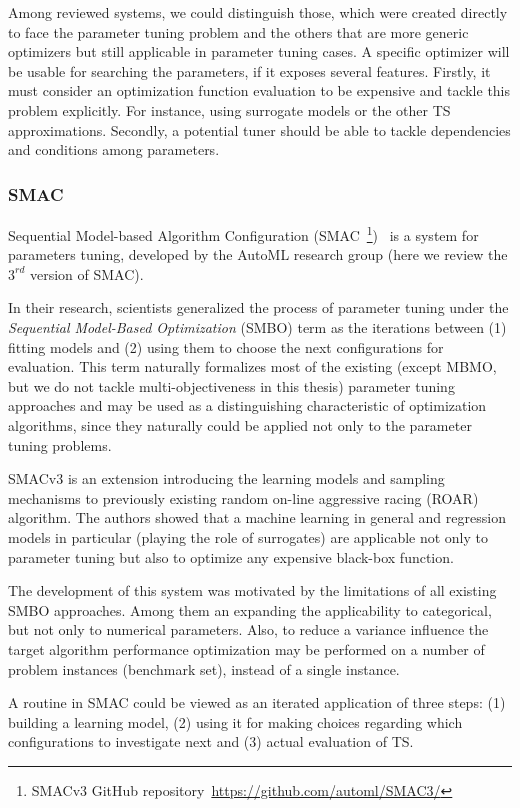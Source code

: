 Among reviewed systems, we could distinguish those, which were created directly to face the parameter tuning problem and the others that are more generic optimizers but still applicable in parameter tuning cases.
A specific optimizer will be usable for searching the parameters, if it exposes several features. Firstly, it must consider an optimization function evaluation to be expensive and tackle this problem explicitly. For instance, using surrogate models or the other TS approximations. Secondly, a potential tuner should be able to tackle dependencies and conditions among parameters.

\subsubsection{SMAC}\label{bg: smac}
Sequential Model-based Algorithm Configuration (SMAC~\footnote{SMACv3 GitHub repository~\url{https://github.com/automl/SMAC3/}})~\cite{hutter2011sequential} is a system for parameters tuning, developed by the AutoML research group (here we review the $3^{rd}$ version of SMAC). 

In their research, scientists generalized the process of parameter tuning under the  \emph{Sequential Model-Based Optimization} (SMBO) term as the iterations between (1) fitting models and (2) using them to choose the next configurations for evaluation. 
This term naturally formalizes most of the existing (except MBMO, but we do not tackle multi-objectiveness in this thesis) parameter tuning approaches and may be used as a distinguishing characteristic of optimization algorithms, since they naturally could be applied not only to the parameter tuning problems.

SMACv3 is an extension introducing the learning models and sampling mechanisms to previously existing random on-line aggressive racing (ROAR) algorithm. The authors showed that a machine learning in general and regression models in particular (playing the role of surrogates) are applicable not only to parameter tuning but also to optimize any expensive black-box function. 

The development of this system was motivated by the limitations of all existing SMBO approaches. Among them an expanding the applicability to categorical, but not only to numerical parameters. Also, to reduce a variance influence the target algorithm performance optimization may be performed on a number of problem instances (benchmark set), instead of a single instance.

A routine in SMAC could be viewed as an iterated application of three steps: (1) building a learning model, (2) using it for making choices regarding which configurations to investigate next and (3) actual evaluation of TS.

